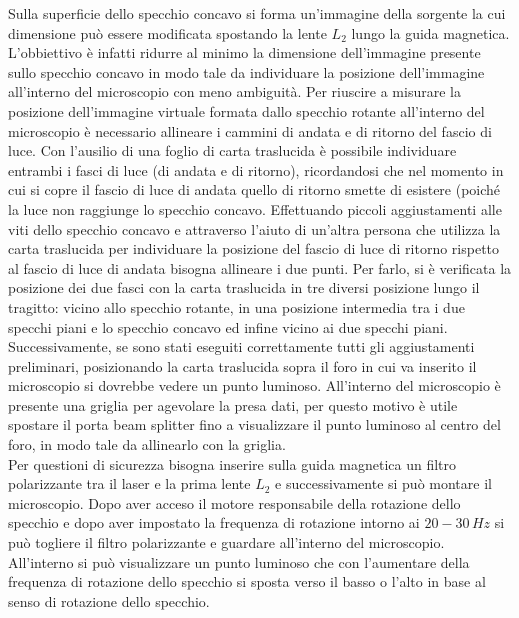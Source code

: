 Sulla superficie dello specchio concavo si forma un'immagine della sorgente la cui dimensione può essere modificata spostando la lente $L_2$ lungo la guida magnetica. L'obbiettivo è infatti ridurre al minimo la dimensione dell'immagine presente sullo specchio concavo in modo tale da individuare la posizione dell'immagine all'interno del microscopio con meno ambiguità. 
Per riuscire a misurare la posizione dell'immagine virtuale formata dallo specchio rotante all'interno del microscopio è necessario allineare i cammini di andata e di ritorno del fascio di luce. Con l'ausilio di una foglio di carta traslucida è possibile individuare entrambi i fasci di luce (di andata e di ritorno), ricordandosi che nel momento in cui si copre il fascio di luce di andata quello di ritorno smette di esistere (poiché la luce non raggiunge lo specchio concavo. Effettuando piccoli aggiustamenti alle viti dello specchio concavo e attraverso l'aiuto di un'altra persona che utilizza la carta traslucida per individuare la posizione del fascio di luce di ritorno rispetto al fascio di luce di andata bisogna allineare i due punti. Per farlo, si è verificata la posizione dei due fasci con la carta traslucida in tre diversi posizione lungo il tragitto: vicino allo specchio rotante, in una posizione intermedia tra i due specchi piani e lo specchio concavo ed infine vicino ai due specchi piani.\\

Successivamente, se sono stati eseguiti correttamente tutti gli aggiustamenti preliminari, posizionando la carta traslucida sopra il foro in cui va inserito il microscopio si dovrebbe vedere un punto luminoso. All'interno del microscopio è presente una griglia per agevolare la presa dati, per questo motivo è utile spostare il porta beam splitter fino a visualizzare il punto luminoso al centro del foro, in modo tale da allinearlo con la griglia.\\

Per questioni di sicurezza bisogna inserire sulla guida magnetica un filtro polarizzante tra il laser e la prima lente $L_2$ e successivamente si può montare il microscopio. Dopo aver acceso il motore responsabile della rotazione dello specchio e dopo aver impostato la frequenza di rotazione intorno ai $20-30 \, Hz$ si può togliere il filtro polarizzante e guardare all'interno del microscopio. All'interno si può visualizzare un punto luminoso che con l'aumentare della frequenza di rotazione dello specchio si sposta verso il basso o l'alto in base al senso di rotazione dello specchio.
